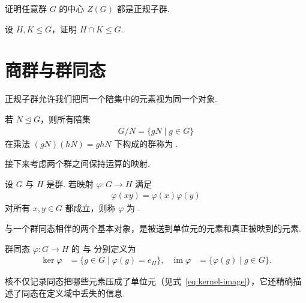 \begin{exercises}
    \item 证明任意群 \(G\) 的中心 \(Z(G)\) 都是正规子群.
    \item 设 \(H,K\leq G\)，证明 \(H\cap K\leq G\).
\end{exercises}

\section{商群与群同态}

正规子群允许我们把同一个陪集中的元素视为同一个对象.

\begin{definition}\label{def:quotient-group}
若 \(N\trianglelefteq G\)，则所有陪集
\begin{align*}
    G/N=\{gN\mid g\in G\}
\end{align*}
在乘法 \((gN)(hN)=ghN\) 下构成的群称为 .
\end{definition}

接下来考虑两个群之间保持运算的映射.

\begin{definition}\label{def:homomorphism}
设 \(G\) 与 \(H\) 是群.
若映射 \(\varphi:G\to H\) 满足
\begin{align*}
    \varphi(xy)=\varphi(x)\varphi(y)
\end{align*}
对所有 \(x,y\in G\) 都成立，则称 \(\varphi\) 为 .
\end{definition}

与一个群同态相伴的两个基本对象，是被送到单位元的元素和真正被映到的元素.

\begin{definition}\label{def:kernel-image}
群同态 \(\varphi:G\to H\) 的  与  分别定义为
\begin{align}
    \ker\varphi&=\{g\in G\mid \varphi(g)=e_H\},
    &
    \operatorname{im}\varphi&=\{\varphi(g)\mid g\in G\}.
    \label{eq:kernel-image}
\end{align}
\end{definition}

核不仅记录同态把哪些元素压成了单位元（见式~\eqref{eq:kernel-image}），它还精确描述了同态在定义域中丢失的信息.

